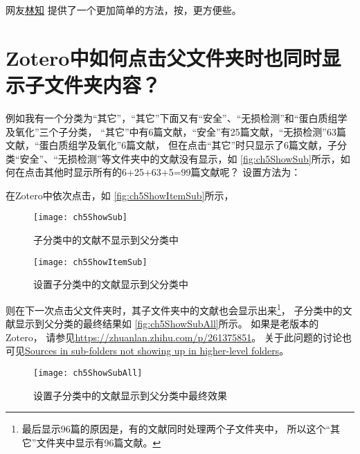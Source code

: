 \documentclass[theorem=false,mathfont=none,openany,sub3section]{easybook}
\begin{document}
{网友\href{https://www.zhihu.com/people/lin-zhi-70}{林知}
提供了一个更加简单的方法，按，更方便些。

\section{Zotero中如何点击父文件夹时也同时显示子文件夹内容？}\label{sec:ShowSub}	
\setcounter{footnote}{0}
	例如我有一个分类为“其它”，“其它”下面又有“安全”、“无损检测”和“蛋白质组学及氧化”三个子分类，
“其它”中有6篇文献，“安全”有25篇文献，“无损检测”63篇文献，“蛋白质组学及氧化”6篇文献，
但在点击“其它”时只显示了6篇文献，子分类“安全”、“无损检测”等文件夹中的文献没有显示，如
\autoref{fig:ch5ShowSub}所示，如何在点击其他时显示所有的6+25+63+5=99篇文献呢？
设置方法为：

在Zotero中依次点击，如
\autoref{fig:ch5ShowItemSub}所示，
	\begin{figure}[ht]
		\centering
		\texttt{[image: ch5ShowSub]}
		\caption{子分类中的文献不显示到父分类中}
		\label{fig:ch5ShowSub}
	\end{figure}	
	\begin{figure}[ht]
		\centering
		\texttt{[image: ch5ShowItemSub]}
		\caption{设置子分类中的文献显示到父分类中}
		\label{fig:ch5ShowItemSub}
	\end{figure}
则在下一次点击父文件夹时，其子文件夹中的文献也会显示出来\footnote{最后显示96篇的原因是，有的文献同时处理两个子文件夹中，
	所以这个“其它”文件夹中显示有96篇文献。}，
子分类中的文献显示到父分类的最终结果如
\autoref{fig:ch5ShowSubAll}所示。
如果是老版本的
Zotero，
请参见\url{https://zhuanlan.zhihu.com/p/261375851}。
关于此问题的讨论也可见\href{https://forums.zotero.org/discussion/68833/sources-in-sub-folders-not-showing-up-in-higher-level-folders}{Sources in sub-folders not showing up in higher-level folders}。
	\begin{figure}[ht]
		\centering
		\texttt{[image: ch5ShowSubAll]}
		\caption{设置子分类中的文献显示到父分类中最终效果}
		\label{fig:ch5ShowSubAll}
	\end{figure}

}
\end{document}
